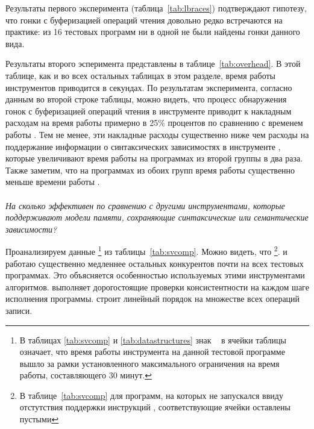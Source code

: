 Результаты первого эксперимента (таблица~\ref{tab:lbraces})
подтверждают гипотезу, что гонки с буферизацией операций чтения 
довольно редко встречаются на практике: 
из 16 тестовых программ ни в одной не были найдены гонки данного вида.



Результаты второго эсперимента представлены в таблице~\ref{tab:overhead}.
В этой таблице, как и во всех остальных таблицах в этом разделе, 
время работы инструментов приводится в секундах.  
По результатам эксперимента, согласно данным во второй строке таблицы, 
можно видеть, что процесс обнаружения гонок с буферизацией операций чтения 
в инструменте \wmc приводит к накладным расходам на время работы 
примерно в 25\% процентов по сравнению с временем работы \genmc.
Тем не менее, эти накладные расходы существенно ниже чем 
расходы на поддержание информации о синтаксических зависимостях
в инструменте \hmc, которые увеличивают время работы \hmc
на программах из второй группы в два раза.  
Также заметим, что на программах из обоих групп
время работы \wmc существенно меньше времени работы \hmc. 



\paragraph{}
\textit{На сколько эффективен \wmc по сравнению с другими инструментами, 
которые поддерживают модели памяти, сохраняющие синтаксические 
или семантические зависимости?}

Проанализируем данные
\footnote{В таблицах \ref{tab:svcomp} и \ref{tab:datastructures}
знак \timeoutNoSpc~ в ячейки таблицы означает, что 
время работы инструмента на данной тестовой программе 
вышло за рамки установленного максимального ограничения на время работы,
составляющего 30 минут.}
из таблицы~\ref{tab:svcomp}. 
Можно видеть, что \Nidhugg%
\footnote{В таблице~\ref{tab:svcomp} для программ, 
на которых \Nidhugg не запускался ввиду отстутствия 
поддержки инструкций \RMW, соответствующие ячейки оставлены пустыми}.
и \rmem работаю существенно медленнее остальных 
конкурентов почти на всех тестовых программах. 
Это объясняется особенностью используемых этими инструментами алгоритмов.
\Nidhugg выполняет дорогостоящие проверки консистентности
на каждом шаге исполнения программы.
\rmem строит линейный порядок на множестве всех операций записи.

